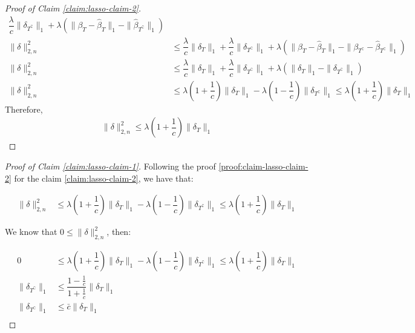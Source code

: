 \begin{proof}[Proof of Claim \ref{claim:lasso-claim-2}]
\begin{align*}
    \dfrac{\lambda}{c} \|\delta_{T^{\complement}}\|_{1} +
    \lambda \left(
        \|\beta_T - \hat{\beta}_T\|_{1} - 
        \|\hat{\beta}_{T^\complement}\|_{1}
    \right)\\
    \|\delta\|_{2, n}^{2}
    &\leq
    \dfrac{\lambda}{c} \|\delta_T\|_{1} +
    \dfrac{\lambda}{c} \|\delta_{T^{\complement}}\|_{1} +
    \lambda \left(
        \|\beta_T - \hat{\beta}_T\|_{1} - 
        \|\beta_{T^\complement} - \hat{\beta}_{T^\complement}\|_{1}
    \right)\\
    \|\delta\|_{2, n}^{2}
    &\leq
    \dfrac{\lambda}{c} \|\delta_T\|_{1} +
    \dfrac{\lambda}{c} \|\delta_{T^{\complement}}\|_{1} +
    \lambda \left(
        \|\delta_T\|_{1} - 
        \|\delta_{T^\complement}\|_{1}
    \right)\\
    \|\delta\|_{2, n}^{2}
    &\leq
    \lambda \left(
        1 + \dfrac{1}{c}
    \right) \|\delta_T\|_{1} -
    \lambda \left(
        1 - \dfrac{1}{c}
    \right) \|\delta_{T^\complement}\|_{1}
    \leq
    \lambda \left(
        1 + \dfrac{1}{c}
    \right) \| \delta_T \|_{1}
\end{align*}
Therefore,
\begin{align*}
    \|\delta\|_{2, n}^{2}
    \leq
    \lambda \left(
        1 + \dfrac{1}{c}
    \right) \| \delta_T \|_{1}
\end{align*}
\end{proof}

\begin{proof}[Proof of Claim \ref{claim:lasso-claim-1}]
Following the proof \ref{proof:claim-lasso-claim-2} for the claim \ref{claim:lasso-claim-2}, we have that:

\begin{align*}
    \|\delta\|_{2, n}^{2}
    &\leq
    \lambda \left(
        1 + \dfrac{1}{c}
    \right) \|\delta_T\|_{1} -
    \lambda \left(
        1 - \dfrac{1}{c}
    \right) \|\delta_{T^\complement}\|_{1}
    \leq
    \lambda \left(
        1 + \dfrac{1}{c}
    \right) \| \delta_T \|_{1}
\end{align*}

We know that $ 0 \leq \|\delta\|_{2, n}^{2}$, then:

\begin{align*}
    0
    &\leq
    \lambda \left(
        1 + \dfrac{1}{c}
    \right) \|\delta_T\|_{1} -
    \lambda \left(
        1 - \dfrac{1}{c}
    \right) \|\delta_{T^\complement}\|_{1}
    \leq
    \lambda \left(
        1 + \dfrac{1}{c}
    \right) \| \delta_T \|_{1}\\
    \| \delta_{T^\complement} \|_{1}
    &\leq 
    \dfrac{1 - \frac{1}{c}}{1 + \frac{1}{c}} \| \delta_T \|_{1}\\
    \| \delta_{T^\complement} \|_{1}
    &\leq 
    \bar{c} \| \delta_T \|_{1}\\
\end{align*}
\end{proof}

